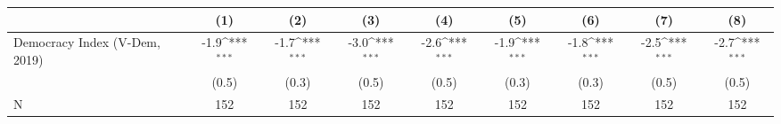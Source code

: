 {
\def\sym#1{\ifmmode^{#1}\else\(^{#1}\)\fi}
\begin{tabular}{l*{8}{c}}
\hline\hline
                    &\multicolumn{1}{c}{(1)}         &\multicolumn{1}{c}{(2)}         &\multicolumn{1}{c}{(3)}         &\multicolumn{1}{c}{(4)}         &\multicolumn{1}{c}{(5)}         &\multicolumn{1}{c}{(6)}         &\multicolumn{1}{c}{(7)}         &\multicolumn{1}{c}{(8)}         \\
\hline
Democracy Index (V-Dem, 2019)&        -1.9\sym{***}&        -1.7\sym{***}&        -3.0\sym{***}&        -2.6\sym{***}&        -1.9\sym{***}&        -1.8\sym{***}&        -2.5\sym{***}&        -2.7\sym{***}\\
                    &       (0.5)         &       (0.3)         &       (0.5)         &       (0.5)         &       (0.3)         &       (0.3)         &       (0.5)         &       (0.5)         \\
\hline
N                   &         152         &         152         &         152         &         152         &         152         &         152         &         152         &         152         \\
\hline\hline
\end{tabular}
}
